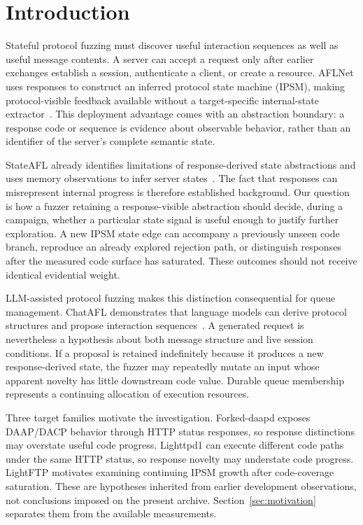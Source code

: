 \documentclass[final,5p,times,number]{elsarticle}
\begin{document}
\section{Introduction}
Stateful protocol fuzzing must discover useful interaction sequences as well as useful message contents. A server can accept a request only after earlier exchanges establish a session, authenticate a client, or create a resource. AFLNet uses responses to construct an inferred protocol state machine (IPSM), making protocol-visible feedback available without a target-specific internal-state extractor~\cite{aflnet}. This deployment advantage comes with an abstraction boundary: a response code or sequence is evidence about observable behavior, rather than an identifier of the server's complete semantic state.

StateAFL already identifies limitations of response-derived state abstractions and uses memory observations to infer server states~\cite{stateafl}. The fact that responses can misrepresent internal progress is therefore established background. Our question is how a fuzzer retaining a response-visible abstraction should decide, during a campaign, whether a particular state signal is useful enough to justify further exploration. A new IPSM state edge can accompany a previously unseen code branch, reproduce an already explored rejection path, or distinguish responses after the measured code surface has saturated. These outcomes should not receive identical evidential weight.

LLM-assisted protocol fuzzing makes this distinction consequential for queue management. ChatAFL demonstrates that language models can derive protocol structures and propose interaction sequences~\cite{chatafl}. A generated request is nevertheless a hypothesis about both message structure and live session conditions. If a proposal is retained indefinitely because it produces a new response-derived state, the fuzzer may repeatedly mutate an input whose apparent novelty has little downstream code value. Durable queue membership represents a continuing allocation of execution resources.

Three target families motivate the investigation. Forked-daapd exposes DAAP/DACP behavior through HTTP status responses, so response distinctions may overstate useful code progress. Lighttpd1 can execute different code paths under the same HTTP status, so response novelty may understate code progress. LightFTP motivates examining continuing IPSM growth after code-coverage saturation. These are hypotheses inherited from earlier development observations, not conclusions imposed on the present archive. Section~\ref{sec:motivation} separates them from the available measurements.
\end{document}
